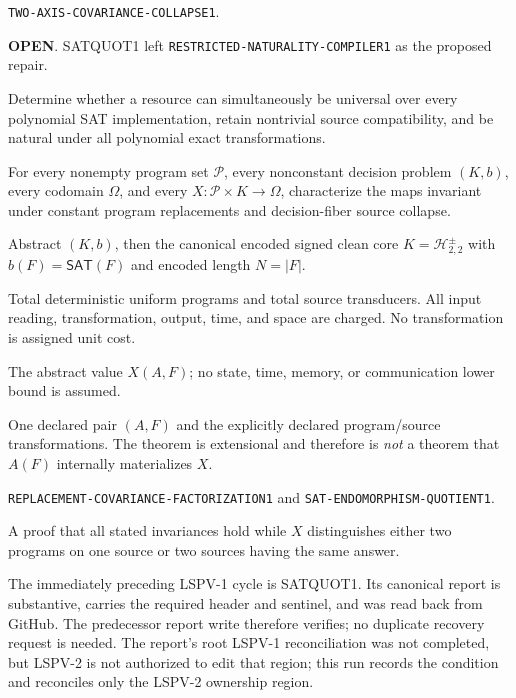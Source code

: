 \documentclass[11pt]{article}
\newcommand{\SAT}{\mathsf{SAT}}
\newcommand{\Hsigned}{\mathcal H^{\pm}_{2,2}}
\newcommand{\OPEN}{\textbf{OPEN}}
\newcommand{\same}{\textsc{same\_realization}}
\begin{document}
\begin{description}[leftmargin=0cm,labelwidth=0cm]
\item[Claim ID.] \texttt{TWO-AXIS-COVARIANCE-COLLAPSE1}.
\item[Status before run.] \OPEN.  SATQUOT1 left
\texttt{RESTRICTED-NATURALITY-COMPILER1} as the proposed repair.
\item[Desired conclusion.] Determine whether a resource can simultaneously be
universal over every polynomial SAT implementation, retain nontrivial source
compatibility, and be natural under all polynomial exact transformations.
\item[Exact prefix.] For every nonempty program set $\mathcal P$, every
nonconstant decision problem $(K,b)$, every codomain $\Omega$, and every
$X:\mathcal P\times K\to\Omega$, characterize the maps invariant under
constant program replacements and decision-fiber source collapse.
\item[Input family.] Abstract $(K,b)$, then the canonical encoded signed clean
core $K=\Hsigned$ with $b(F)=\SAT(F)$ and encoded length $N=|F|$.
\item[Model.] Total deterministic uniform programs and total source
transducers.  All input reading, transformation, output, time, and space are
charged.  No transformation is assigned unit cost.
\item[Resource.] The abstract value $X(A,F)$; no state, time, memory, or
communication lower bound is assumed.
\item[\same{} objects.] One declared pair $(A,F)$ and the explicitly declared
program/source transformations.  The theorem is extensional and therefore is
\emph{not} a theorem that $A(F)$ internally materializes $X$.
\item[Minimum predecessor.] \texttt{REPLACEMENT-COVARIANCE-FACTORIZATION1}
and \texttt{SAT-ENDOMORPHISM-QUOTIENT1}.
\item[What falsifies the proposed obstruction.] A proof that all stated
invariances hold while $X$ distinguishes either two programs on one source or
two sources having the same answer.
\end{description}

The immediately preceding LSPV-1 cycle is SATQUOT1.  Its canonical report is
substantive, carries the required header and sentinel, and was read back from
GitHub.  The predecessor report write therefore verifies; no duplicate
recovery request is needed.  The report's root LSPV-1 reconciliation was not
completed, but LSPV-2 is not authorized to edit that region; this run records
the condition and reconciles only the LSPV-2 ownership region.
\end{document}
